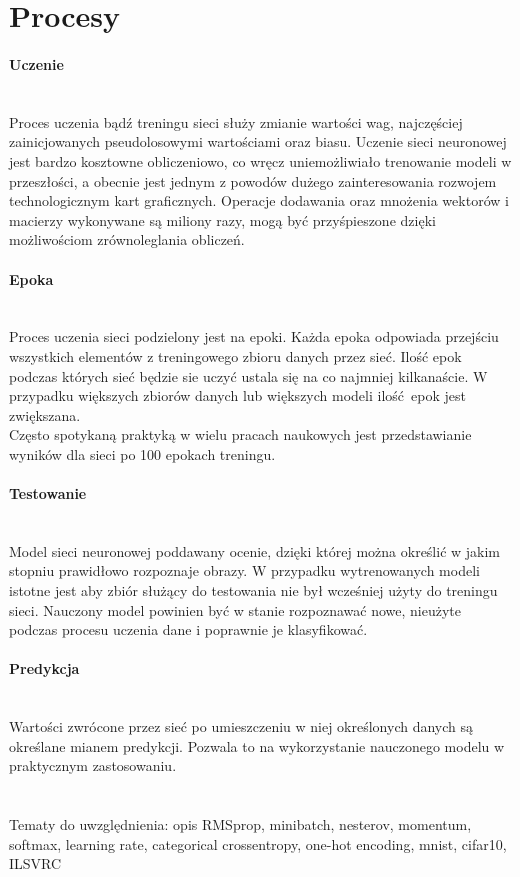 \section{Procesy}

\paragraph{Uczenie} \mbox{}\\
Proces uczenia bądź treningu sieci służy zmianie wartości wag, najczęściej zainicjowanych
pseudolosowymi wartościami oraz biasu. Uczenie sieci neuronowej jest bardzo
kosztowne obliczeniowo, co wręcz uniemożliwiało trenowanie modeli w przeszłości,
a obecnie jest jednym z powodów dużego zainteresowania rozwojem technologicznym kart
graficznych. Operacje dodawania oraz mnożenia wektorów i macierzy wykonywane są miliony razy,
mogą być przyśpieszone dzięki możliwościom zrównoleglania obliczeń.\\

\paragraph{Epoka} \mbox{}\\
Proces uczenia sieci podzielony jest na epoki. Każda epoka odpowiada przejściu
wszystkich elementów z treningowego zbioru danych przez sieć. Ilość epok podczas
których sieć będzie sie uczyć ustala się na co najmniej kilkanaście. W przypadku
większych zbiorów danych lub większych modeli ilość epok jest zwiększana.\\
Często spotykaną praktyką w wielu pracach naukowych jest przedstawianie wyników
dla sieci po 100 epokach treningu.

\paragraph{Testowanie} \mbox{}\\
Model sieci neuronowej poddawany ocenie, dzięki której można określić w jakim stopniu
prawidłowo rozpoznaje obrazy. W przypadku wytrenowanych modeli istotne jest aby zbiór służący do
testowania nie był wcześniej użyty do treningu sieci. Nauczony model powinien być w stanie
rozpoznawać nowe, nieużyte podczas procesu uczenia dane i poprawnie je klasyfikować.

\paragraph{Predykcja} \mbox{}\\
Wartości zwrócone przez sieć po umieszczeniu w niej określonych danych są określane
mianem predykcji. Pozwala to na wykorzystanie nauczonego modelu w praktycznym
zastosowaniu. \\\\\\

Tematy do uwzględnienia:
opis RMSprop,
minibatch,
nesterov,
momentum,
softmax,
learning rate,
categorical crossentropy,
one-hot encoding,
mnist, cifar10, ILSVRC
